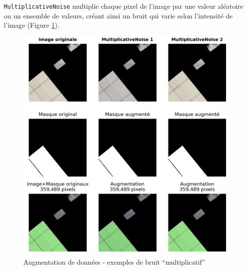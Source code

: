 \newpage
\texttt{MultiplicativeNoise} multiplie chaque pixel de l'image par une valeur aléatoire ou un ensemble de valeurs, créant ainsi un bruit qui varie selon l'intensité de l'image (Figure \ref{fig:ch36_augmentations_10_bruit_multiplicatif}).
\begin{figure}[H]
    \centering
    \includegraphics[width=1\linewidth]{02-main/figures/ch3/ch36_augmentations_10_bruit_multiplicatif.png}
    \caption{Augmentation de données - exemples de bruit ``multiplicatif''}
    \label{fig:ch36_augmentations_10_bruit_multiplicatif}
\end{figure}

